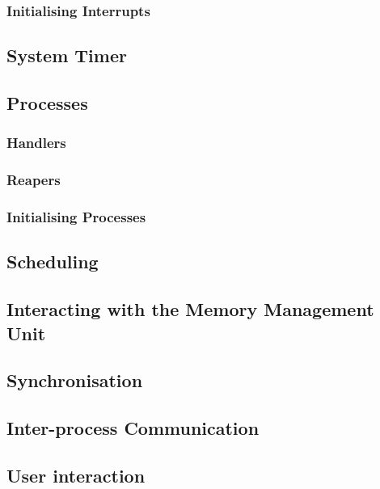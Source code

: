     \subsubsection{Initialising Interrupts}

\subsection{System Timer}
\subsection{Processes}
    \subsubsection{Handlers}
    \subsubsection{Reapers}
        \label{sec:cleanup}
    \subsubsection{Initialising Processes}
\subsection{Scheduling}
\subsection{Interacting with the Memory Management Unit}
\subsection{Synchronisation}
\subsection{Inter-process Communication}
\subsection{User interaction}
